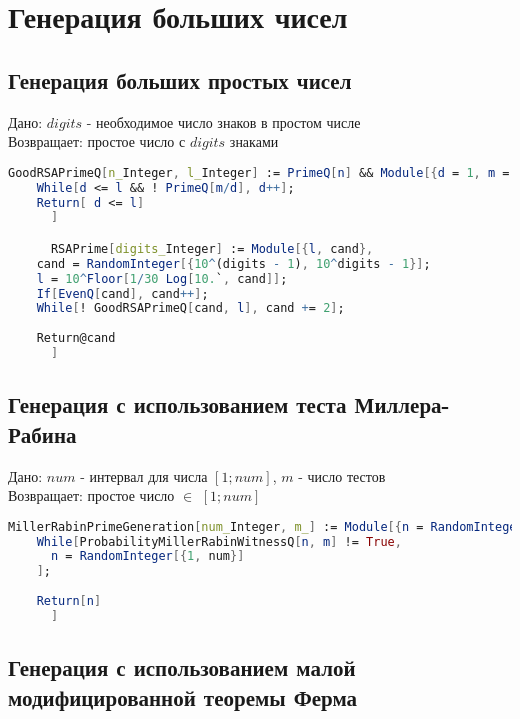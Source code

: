 \section{Генерация больших чисел}

  \subsection{Генерация больших простых чисел}

    Дано: {$digits$} - необходимое число знаков в простом числе \\
    Возвращает: простое число с  {$digits$} знаками

    \begin{lstlisting}[language=Mathematica,caption={
      Генерация больших простых чисел
    }]
      GoodRSAPrimeQ[n_Integer, l_Integer] := PrimeQ[n] && Module[{d = 1, m = (n - 1)/2},
	While[d <= l && ! PrimeQ[m/d], d++];
	Return[ d <= l]
      ]

      RSAPrime[digits_Integer] := Module[{l, cand},
	cand = RandomInteger[{10^(digits - 1), 10^digits - 1}];
	l = 10^Floor[1/30 Log[10.`, cand]];
	If[EvenQ[cand], cand++];
	While[! GoodRSAPrimeQ[cand, l], cand += 2];
	
	Return@cand
      ]

    \end{lstlisting}

  \subsection{Генерация с использованием теста Миллера-Рабина}

    Дано: {$num$} - интервал для числа {$[1;num]$}, {$m$} - число тестов \\
    Возвращает: простое число {$\in$} {$[1;num]$}

    \begin{lstlisting}[language=Mathematica,caption={
      Генерация с использованием теста Миллера-Рабина  
    }]
      MillerRabinPrimeGeneration[num_Integer, m_] := Module[{n = RandomInteger[{1, num}]},
	While[ProbabilityMillerRabinWitnessQ[n, m] != True, 
	  n = RandomInteger[{1, num}]
	];
      
	Return[n]
      ]
    \end{lstlisting}

  \subsection{Генерация с использованием малой модифицированной теоремы Ферма}

